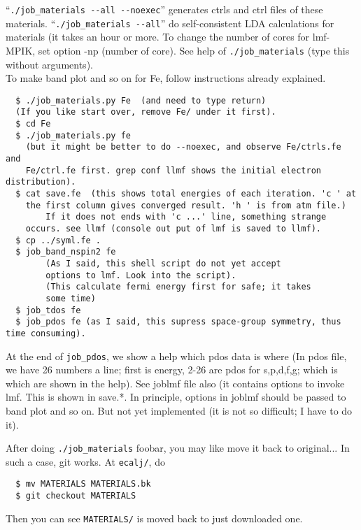 \documentclass[a4paper,10pt,epsf,fleqn]{article}
\begin{document}
``\verb+./job_materials --all --noexec+'' generates ctrls and ctrl files of
these materials. ``\verb+./job_materials --all+'' do self-consistent
LDA calculations for materials (it takes an hour or more. To change the
number of cores for lmf-MPIK, set option -np (number of core). See
help of \verb+./job_materials+ (type this without arguments).\\

To make band plot and so on for Fe, follow instructions already explained.
\begin{verbatim}
  $ ./job_materials.py Fe  (and need to type return)
  (If you like start over, remove Fe/ under it first).
  $ cd Fe
  $ ./job_materials.py fe
    (but it might be better to do --noexec, and observe Fe/ctrls.fe and
	Fe/ctrl.fe first. grep conf llmf shows the initial electron distribution).
  $ cat save.fe  (this shows total energies of each iteration. 'c ' at
	the first column gives converged result. 'h ' is from atm file.)
        If it does not ends with 'c ...' line, something strange
	occurs. see llmf (console out put of lmf is saved to llmf).
  $ cp ../syml.fe .
  $ job_band_nspin2 fe 
        (As I said, this shell script do not yet accept
	    options to lmf. Look into the script).
        (This calculate fermi energy first for safe; it takes
	    some time)       
  $ job_tdos fe
  $ job_pdos fe (as I said, this supress space-group symmetry, thus time consuming).
\end{verbatim}
At the end of \verb+job_pdos+, we show a help which pdos data is where
(In pdos file, we have 26 numbers a line; first is energy, 2-26 are pdos
for s,p,d,f,g; which is which are shown in the help).
See joblmf file also (it contains options to invoke lmf. This is shown
in save.*. In principle, options in joblmf should be passed to band plot
and so on. But not yet implemented 
(it is not so difficult; I have to do it).

After doing \verb+./job_materials+ foobar, you may like move it back to
original... In such a case, git works. At \verb+ecalj/+, do
\begin{verbatim}
  $ mv MATERIALS MATERIALS.bk
  $ git checkout MATERIALS
\end{verbatim}
Then you can see \verb+MATERIALS/+ is moved back to just downloaded one.

\end{document}
